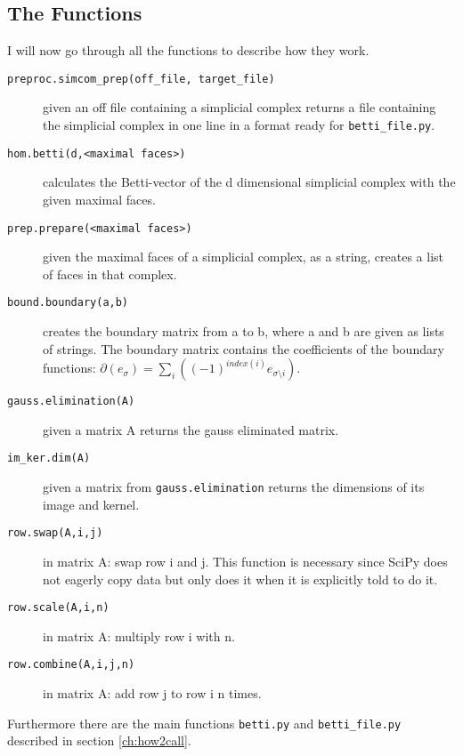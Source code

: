 \documentclass[11pt,a4paper,twoside]{report}
\begin{document}
\subsection{The Functions}

I will now go through all the functions to describe how they work.

\begin{description}
\item[\texttt{preproc.simcom\_prep(off\_file, target\_file)}] given an off file containing a simplicial complex returns a file containing the simplicial complex in one line in a format ready for \texttt{betti\_file.py}. 
\item[\texttt{hom.betti(d,<maximal faces>)}] calculates the Betti-vector of the d dimensional simplicial complex with the given maximal faces.
\item[\texttt{prep.prepare(<maximal faces>)}] given the maximal faces of a simplicial complex, as a string, creates a list of faces in that complex.
\item[\texttt{bound.boundary(a,b)}]creates the boundary matrix from a to b, where a and b are given as lists of strings. The boundary matrix contains the coefficients of the boundary functions: $\partial(e_{\sigma}) = \sum_i((-1)^{index(i)}e_{\sigma\setminus i})$.
\item[\texttt{gauss.elimination(A)}] given a matrix A returns the gauss eliminated matrix.
\item[\texttt{im\_ker.dim(A)}] given a matrix from \texttt{gauss.elimination} returns the dimensions of its image and kernel.
\item[\texttt{row.swap(A,i,j)}] in matrix A: swap row i and j. This function is necessary since SciPy does not eagerly copy data but only does it when it is explicitly told to do it.
\item[\texttt{row.scale(A,i,n)}] in matrix A: multiply row i with n.
\item[\texttt{row.combine(A,i,j,n)}] in matrix A: add row j to row i n times.
\end{description}
Furthermore there are the main functions \texttt{betti.py} and \texttt{betti\_file.py} described in section \ref{ch:how2call}.
\end{document}
